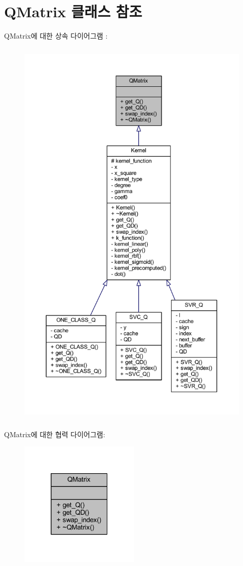 \hypertarget{class_q_matrix}{\section{Q\+Matrix 클래스 참조}
\label{class_q_matrix}
}


Q\+Matrix에 대한 상속 다이어그램 \+: 
\nopagebreak
\begin{figure}[H]
\begin{center}
\leavevmode
\includegraphics[height=550pt]{class_q_matrix__inherit__graph}
\end{center}
\end{figure}


Q\+Matrix에 대한 협력 다이어그램\+:
\nopagebreak
\begin{figure}[H]
\begin{center}
\leavevmode
\includegraphics[width=163pt]{class_q_matrix__coll__graph}
\end{center}
\end{figure}

